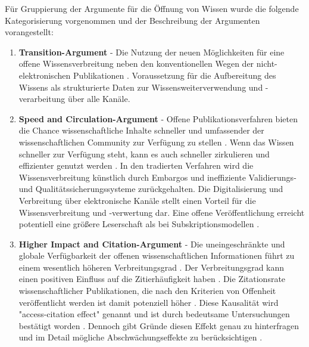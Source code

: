 Für Gruppierung der Argumente für die Öffnung von Wissen wurde die folgende Kategorisierung vorgenommen und der Beschreibung der Argumenten vorangestellt:
\begin{enumerate}
\item \textbf{Transition-Argument} - Die Nutzung der neuen Möglichkeiten für eine offene Wissensverbreitung neben den konventionellen Wegen der nicht-elektronischen Publikationen \cite{berliner_erklaerung_2003}. Voraussetzung für die Aufbereitung des Wissens als strukturierte Daten zur Wissensweiterverwendung und -verarbeitung über alle Kanäle.
\item \textbf{Speed and Circulation-Argument} - Offene Publikationsverfahren bieten die Chance wissenschaftliche Inhalte schneller und umfassender der wissenschaftlichen Community zur Verfügung zu stellen \cite{muller_2010_open} \cite{EuropeanCommission_sciencepub_2006}. Wenn das Wissen schneller zur Verfügung steht, kann es auch schneller zirkulieren und effizienter genutzt werden \cite{Woelfle_2011}. In den tradierten Verfahren wird die Wissensverbreitung künstlich durch Embargos und ineffiziente Validierungs- und Qualitätssicherungssysteme zurückgehalten. Die Digitalisierung und Verbreitung über elektronische Kanäle stellt einen Vorteil für die Wissensverbreitung und -verwertung dar. Eine offene Veröffentlichung erreicht potentiell eine größere Leserschaft als bei Subskriptionsmodellen \cite{cope2014future}.
\item \textbf{Higher Impact and Citation-Argument} - Die uneingeschränkte und globale Verfügbarkeit der offenen wissenschaftlichen Informationen führt zu einem wesentlich höheren Verbreitungsgrad \cite{davis_2011_open} \cite{muller_2010_open} \cite{Kurtz2005_oa_citation}. Der Verbreitungsgrad kann einen positiven Einfluss auf die Zitierhäufigkeit haben \cite{muller_2010_open} \cite{EuropeanCommission_sciencepub_2006} \cite{Hajjem_2005}. Die Zitationsrate wissenschaftlicher Publikationen, die nach den Kriterien von Offenheit veröffentlicht werden ist damit potenziell höher \cite{cite:21a}. Diese Kausalität wird "access-citation effect"\cite{davis_2011_open} genannt und ist durch bedeutsame Untersuchungen bestätigt worden \cite{Lawrence_2001} \cite{Jeffrey_2008} \cite{Hajjem_2005} \cite{Eysenbach_2006} \cite{Antelman_2004}. Dennoch gibt Gründe diesen Effekt genau zu hinterfragen und im Detail mögliche Abschwächungseffekte zu berücksichtigen \cite{davis_2011_open} \cite{davis_2008_open}.

\end{enumerate}
